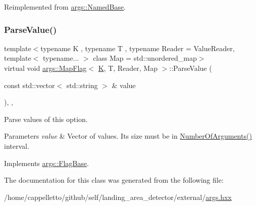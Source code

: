 Reimplemented from \hyperlink{classargs_1_1_named_base_aa9104a04001d10c5732a5feb01204cf7}{args\+::\+Named\+Base}.

\mbox{\label{classargs_1_1_map_flag_a1f21b9227ab9b346b86f8533213a8272}} 
\subsubsection{\texorpdfstring{Parse\+Value()}{ParseValue()}}
{\footnotesize\ttfamily template$<$typename K , typename T , typename Reader  = Value\+Reader, template$<$ typename... $>$ class Map = std\+::unordered\+\_\+map$>$ \\
virtual void \hyperlink{classargs_1_1_map_flag}{args\+::\+Map\+Flag}$<$ \hyperlink{cgal__test_8cpp_a891e241aa245ae63618f03737efba309}{K}, T, Reader, Map $>$\+::Parse\+Value (\begin{DoxyParamCaption}\item[{const std\+::vector$<$ std\+::string $>$ \&}]{value }\end{DoxyParamCaption})\hspace{0.3cm}{\ttfamily [inline]}, {\ttfamily [override]}, {\ttfamily [virtual]}}

Parse values of this option.


\begin{DoxyParams}{Parameters}
{\em value} & Vector of values. It\textquotesingle{}s size must be in \hyperlink{classargs_1_1_value_flag_base_a96a10bfb949ad175dcf2ffba6a6ec3b6}{Number\+Of\+Arguments()} interval. \\
\hline
\end{DoxyParams}


Implements \hyperlink{classargs_1_1_flag_base_a3421d9a595c9426dc73f62604cdee84f}{args\+::\+Flag\+Base}.



The documentation for this class was generated from the following file\+:\begin{DoxyCompactItemize}
\item 
/home/cappelletto/github/self/landing\+\_\+area\+\_\+detector/external/\hyperlink{args_8hxx}{args.\+hxx}\end{DoxyCompactItemize}
